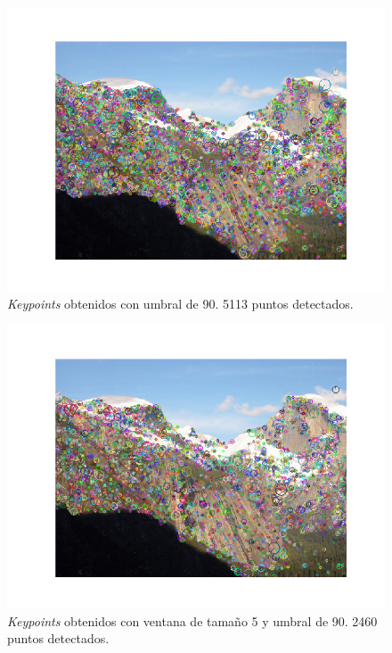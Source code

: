 \documentclass[11pt,a4paper]{article}
\begin{document}
\begin{figure}[H]
	\centering
	\includegraphics[scale=0.6]{img/kp-thresh90}
	\caption{\textit{Keypoints} obtenidos con  umbral de 90. 5113 puntos detectados.}
	\label{fig:kp-thresh90}
\end{figure}

\begin{figure}[H]
	\centering
	\includegraphics[scale=0.6]{img/kp-wind-thresh}
	\caption{\textit{Keypoints} obtenidos con ventana de tamaño 5 y umbral de 90. 2460 puntos detectados.}
	\label{fig:kp-wind-thresh}
\end{figure}
\end{document}
